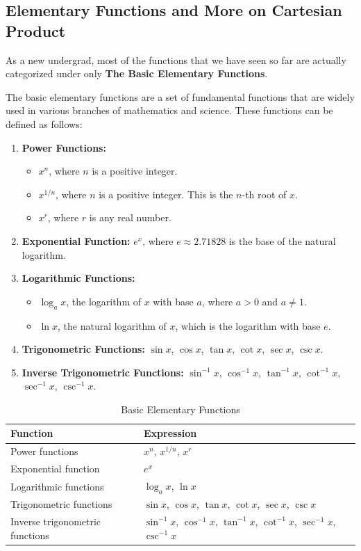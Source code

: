 \subsection{Elementary Functions and More on Cartesian Product}
As a new undergrad, most of the functions that we have seen so far are actually categorized under only \textbf{The Basic Elementary Functions}.
\begin{definition}
	The basic elementary functions are a set of fundamental functions that are widely used in various branches of mathematics and science. These functions can be defined as follows:
	
	\begin{enumerate}
		\item \textbf{Power Functions:}
		\begin{itemize}
			\item $x^n$, where $n$ is a positive integer.
			\item $x^{1/n}$, where $n$ is a positive integer. This is the $n$-th root of $x$.
			\item $x^r$, where $r$ is any real number.
		\end{itemize}
		\item \textbf{Exponential Function:} $e^x$, where $e \approx 2.71828$ is the base of the natural logarithm.
		\item \textbf{Logarithmic Functions:}
		\begin{itemize}
			\item $\log_a x$, the logarithm of $x$ with base $a$, where $a > 0$ and $a \neq 1$.
			\item $\ln x$, the natural logarithm of $x$, which is the logarithm with base $e$.
		\end{itemize}
		\item \textbf{Trigonometric Functions:} $\sin x$, $\cos x$, $\tan x$, $\cot x$, $\sec x$, $\csc x$.
		\item \textbf{Inverse Trigonometric Functions:} $\sin^{-1} x$, $\cos^{-1} x$, $\tan^{-1} x$, $\cot^{-1} x$, $\sec^{-1} x$, $\csc^{-1} x$.
	\end{enumerate}
	\begin{table}[H]
		\centering
		\caption{Basic Elementary Functions}
		\begin{tabular}{|l|l|}
			\hline
			\textbf{Function} & \textbf{Expression} \\
			\hline
			Power functions & $x^n$, $x^{1/n}$, $x^r$ \\
			Exponential function & $e^x$ \\
			Logarithmic functions & $\log_a x$, $\ln x$ \\
			Trigonometric functions & $\sin x$, $\cos x$, $\tan x$, $\cot x$, $\sec x$, $\csc x$ \\
			Inverse trigonometric functions & $\sin^{-1} x$, $\cos^{-1} x$, $\tan^{-1} x$, $\cot^{-1} x$, $\sec^{-1} x$, $\csc^{-1} x$ \\
			\hline
		\end{tabular}
		\label{tab:basic_functions}
	\end{table}
\end{definition}
